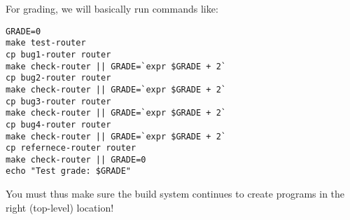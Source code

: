 \documentclass{article}
\begin{document}
For grading, we will basically run commands like:
\begin{verbatim}
GRADE=0
make test-router
cp bug1-router router
make check-router || GRADE=`expr $GRADE + 2`
cp bug2-router router
make check-router || GRADE=`expr $GRADE + 2`
cp bug3-router router
make check-router || GRADE=`expr $GRADE + 2`
cp bug4-router router
make check-router || GRADE=`expr $GRADE + 2`
cp refernece-router router
make check-router || GRADE=0
echo "Test grade: $GRADE"
\end{verbatim}
You must thus make sure the build system continues to create programs in the
right (top-level) location!
\end{document}
